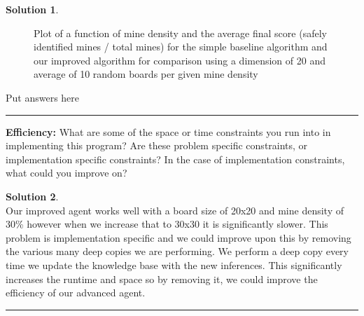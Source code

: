 \documentclass{article}
\theoremstyle{definition}
\def\fline{\rule{0.75\linewidth}{0.5pt}}
\newcommand{\finishline}{\vspace{-15pt}\begin{center}\fline\end{center}}
\newtheorem*{solution*}{Solution}
\newenvironment{solution}{\begin{solution*}}{{\finishline} \end{solution*}}
\begin{document}
\begin{solution}

    \begin{figure}[h]
	\centering
	\caption{Plot of a function of mine density and the average final score (safely identified mines / total mines) for the simple baseline algorithm and our improved algorithm for comparison using a dimension of 20 and average of 10 random boards per given mine density}
	\end{figure}
	
    Put answers here
	
\end{solution}

\smallskip

\textbf{Efficiency: }
What are some of the space or time constraints you run into in implementing this program? 
Are these problem specific constraints, or implementation specific constraints? 
In the case of implementation constraints, what could you improve on?


\smallskip

\begin{solution} \hfil \\
    Our improved agent works well with a board size of 20x20 and mine density of 30\% however when we increase that to 30x30 it is significantly slower.
    This problem is implementation specific and we could improve upon this by removing the various many deep copies we are performing. We perform a deep copy every time we update the knowledge base with the new inferences. This significantly increases the runtime and space so by removing it, we could improve the efficiency of our advanced agent.
\end{solution}
\smallskip
\end{document}
